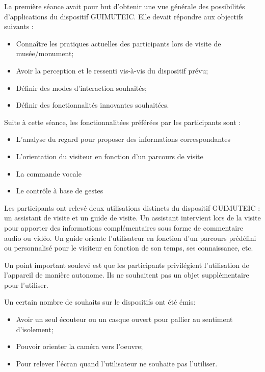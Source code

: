La première séance avait pour but d'obtenir une vue générale des possibilités d'applications du dispositif GUIMUTEIC.
Elle devait répondre aux objectifs suivants : 
\begin{itemize}
	\item Connaître les pratiques actuelles des participants lors de visite de musée/monument;
	\item Avoir la perception et le ressenti vis-à-vis du dispositif prévu;
	\item Définir des modes d'interaction souhaités;
	\item Définir des fonctionnalités innovantes souhaitées.
\end{itemize}

Suite à cette séance, les fonctionnalitées préférées par les participants sont : 
\begin{itemize}
\item L’analyse du regard pour proposer des informations correspondantes
\item L’orientation du visiteur en fonction d’un parcours de visite
\item La commande vocale
\item Le contrôle à base de gestes
\end{itemize}

Les participants ont relevé deux utilisations distincts du dispositif GUIMUTEIC : un assistant de visite et un guide de visite.
Un assistant intervient lors de la visite pour apporter des informations complémentaires sous forme de commentaire audio ou vidéo.
Un guide oriente l’utilisateur en fonction d’un parcours prédéfini ou personnalisé pour le visiteur en fonction de son temps, ses connaissance, etc.

Un point important soulevé est que les participants privilégient l’utilisation de l’appareil de manière autonome. Ils ne souhaitent pas un objet supplémentaire pour l’utiliser.

Un certain nombre de souhaits sur le dispositifs ont été émis: 
\begin{itemize}
\item Avoir un seul écouteur ou un casque ouvert pour pallier au sentiment d’isolement;
\item Pouvoir orienter la caméra vers l’oeuvre;
\item Pour relever l’écran quand l’utilisateur ne souhaite pas l’utiliser.
\end{itemize}





